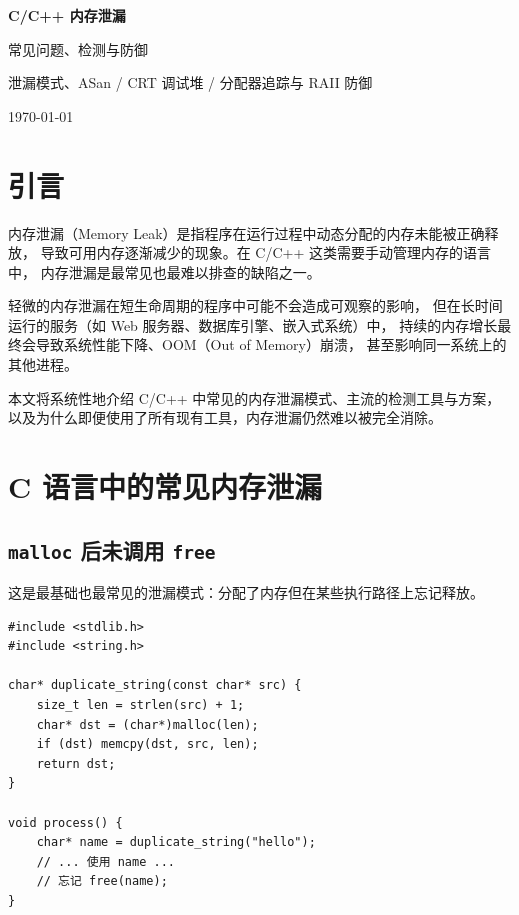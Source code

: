 \documentclass[12pt,a4paper,fontset=fandol]{ctexbook}
\begin{document}
\frontmatter

\begin{titlepage}
\centering
\vspace*{4cm}
{\Huge\bfseries C/C++ 内存泄漏\par}
\vspace{1cm}
{\LARGE 常见问题、检测与防御\par}
\vspace{0.4cm}
{\Large 泄漏模式、ASan / CRT 调试堆 / 分配器追踪与 RAII 防御\par}
\vfill
{\large \today\par}
\end{titlepage}

\tableofcontents

\mainmatter

\cleardoublepage

\section{引言}

内存泄漏（Memory Leak）是指程序在运行过程中动态分配的内存未能被正确释放，
导致可用内存逐渐减少的现象。在 C/C++ 这类需要手动管理内存的语言中，
内存泄漏是最常见也最难以排查的缺陷之一。

轻微的内存泄漏在短生命周期的程序中可能不会造成可观察的影响，
但在长时间运行的服务（如 Web 服务器、数据库引擎、嵌入式系统）中，
持续的内存增长最终会导致系统性能下降、OOM（Out of Memory）崩溃，
甚至影响同一系统上的其他进程。

本文将系统性地介绍 C/C++ 中常见的内存泄漏模式、主流的检测工具与方案，
以及为什么即便使用了所有现有工具，内存泄漏仍然难以被完全消除。


\section{C 语言中的常见内存泄漏}

\subsection{\texttt{malloc} 后未调用 \texttt{free}}

这是最基础也最常见的泄漏模式：分配了内存但在某些执行路径上忘记释放。

\begin{lstlisting}[style=cppstyle, caption={基本泄漏：忘记 free}]
#include <stdlib.h>
#include <string.h>

char* duplicate_string(const char* src) {
    size_t len = strlen(src) + 1;
    char* dst = (char*)malloc(len);
    if (dst) memcpy(dst, src, len);
    return dst;
}

void process() {
    char* name = duplicate_string("hello");
    // ... 使用 name ...
    // 忘记 free(name);
}
\end{lstlisting}
\end{document}
